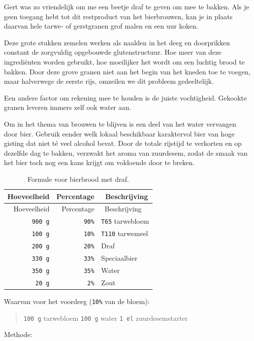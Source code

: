 \documentclass[
  11pt,
  dutch,
]{memoir}
\begin{document}
Gert was zo vriendelijk om me een beetje draf te geven om mee te bakken.
Als je geen toegang hebt tot dit restproduct van het bierbrouwen, kan je
in plaats daarvan hele tarwe- of gerstgranen grof malen en een uur
koken.

Deze grote stukken zemelen werken als naalden in het deeg en doorprikken
constant de zorgvuldig opgebouwde glutenstructuur. Hoe meer van deze
ingrediënten worden gebruikt, hoe moeilijker het wordt om een luchtig
brood te bakken. Door deze grove granen niet aan het begin van het
kneden toe te voegen, maar halverwege de eerste rijs, omzeilen we dit
probleem gedeeltelijk.

Een andere factor om rekening mee te houden is de juiste vochtigheid.
Gekookte granen leveren immers zelf ook water aan.

Om in het thema van brouwen te blijven is een deel van het water
vervangen door bier. Gebruik eender welk lokaal beschikbaar karaktervol
bier van hoge gisting dat niet té veel alcohol bevat. Door de totale
rijstijd te verkorten en op dezelfde dag te bakken, verzwakt het aroma
van zuurdesem, zodat de smaak van het bier toch nog een kans krijgt om
voldoende door te breken.

\begin{longtable}[]{@{}rrl@{}}
\caption{Formule voor bierbrood met draf.}\tabularnewline
\toprule
Hoeveelheid & Percentage & ~Beschrijving\tabularnewline
\midrule
\endfirsthead
\toprule
Hoeveelheid & Percentage & ~Beschrijving\tabularnewline
\midrule
\endhead
\texttt{900\ g} & \texttt{90\%} & \texttt{T65} tarwebloem\tabularnewline
\texttt{100\ g} & \texttt{10\%} & \texttt{T110} tarwemeel\tabularnewline
\texttt{200\ g} & \texttt{20\%} & Draf\tabularnewline
\texttt{330\ g} & \texttt{33\%} & Speciaalbier\tabularnewline
\texttt{350\ g} & \texttt{35\%} & Water\tabularnewline
\texttt{20\ g} & \texttt{2\%} & Zout\tabularnewline
\bottomrule
\end{longtable}

Waarvan voor het voordeeg (\texttt{10\%} van de bloem):

\begin{quote}
\texttt{100\ g} tarwebloem \newline \texttt{100\ g} water \newline
\texttt{1\ el} zuurdesemstarter
\end{quote}

Methode:
\end{document}
